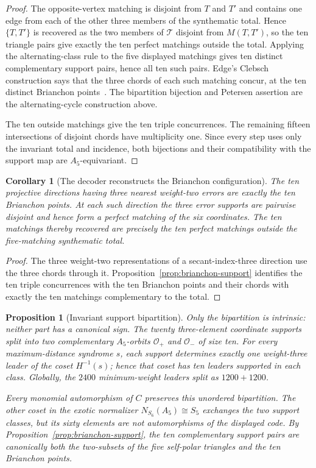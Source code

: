 \documentclass[11pt]{article}
\newtheorem{proposition}[theorem]{Proposition}
\newtheorem{corollary}[theorem]{Corollary}
\theoremstyle{definition}
\theoremstyle{remark}
\begin{document}
\begin{proof}
The opposite-vertex matching is disjoint from $T$ and $T'$ and contains
one edge from each of the other three members of the synthematic total.
Hence $\{T,T'\}$ is recovered as the two members of $\mathcal T$ disjoint
from $M(T,T')$, so the ten triangle pairs give exactly the ten perfect
matchings outside the total. Applying the alternating-class rule to the
five displayed matchings gives ten distinct complementary support pairs,
hence all ten such pairs. Edge's Clebsch construction says that the
three chords of each such matching concur, at the ten distinct Brianchon
points~\cite[\S\S19--20,30]{Edge1956}. The bipartition bijection and
Petersen assertion are the alternating-cycle construction above.

The ten outside matchings give the ten triple concurrences. The remaining
fifteen intersections of disjoint chords have multiplicity one. Since every
step uses only the invariant total and incidence, both bijections and their
compatibility with the support map are $A_5$-equivariant.
\end{proof}

\begin{corollary}[The decoder reconstructs the Brianchon configuration]
\label{cor:decoder-brianchon}
The ten projective directions having three nearest weight-two errors are
exactly the ten Brianchon points.  At each such direction the three error
supports are pairwise disjoint and hence form a perfect matching of the six
coordinates.  The ten matchings thereby recovered are precisely the ten
perfect matchings outside the five-matching synthematic total.
\end{corollary}

\begin{proof}
The three weight-two representations of a secant-index-three direction use
the three chords through it.  Proposition~\ref{prop:brianchon-support}
identifies the ten triple concurrences with the ten Brianchon points and
their chords with exactly the ten matchings complementary to the total.
\end{proof}

\begin{proposition}[Invariant support bipartition]
\label{prop:chirality}
Only the bipartition is intrinsic: neither part has a canonical sign. The
twenty three-element coordinate supports split into two complementary
$A_5$-orbits $\mathcal O_+$ and $\mathcal O_-$ of size ten. For every
maximum-distance syndrome $s$, each support determines exactly one
weight-three leader of the coset $H^{-1}(s)$; hence that coset has ten
leaders supported in each class. Globally, the $2400$ minimum-weight
leaders split as $1200+1200$.

Every monomial automorphism of $C$ preserves this unordered bipartition.
The other coset in the exotic normalizer $N_{S_6}(A_5)\cong S_5$ exchanges
the two support classes, but its sixty elements are not automorphisms of the
displayed code. By
Proposition~\ref{prop:brianchon-support}, the ten complementary support
pairs are canonically both the two-subsets of the five self-polar triangles
and the ten Brianchon points.
\end{proposition}
\end{document}
